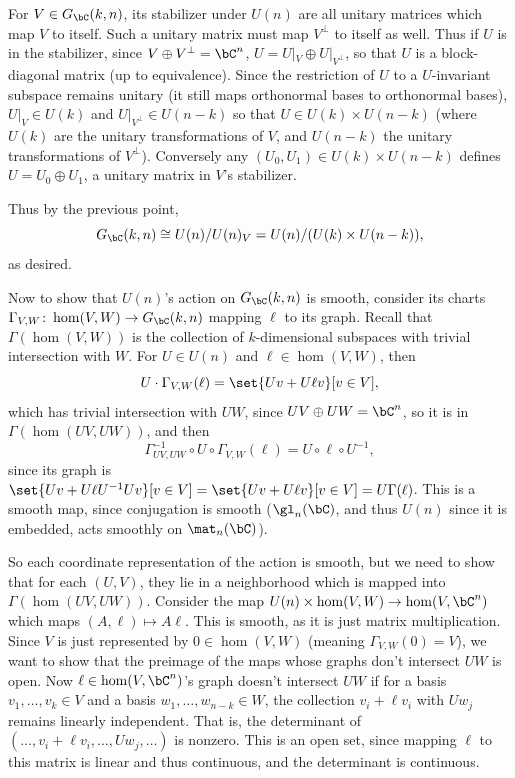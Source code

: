     For $V\in G_\bC(k,n)$, its stabilizer under $U(n)$ are all unitary matrices which map $V$ to itself.
    Such a unitary matrix must map $V^\perp$ to itself as well.
    Thus if $U$ is in the stabilizer, since $V\oplus V^\perp=\bC^n$, $U=U|_V\oplus U|_{V^\perp}$, so that $U$ is a block-diagonal matrix (up to equivalence).
    Since the restriction of $U$ to a $U$-invariant subspace remains unitary (it still maps orthonormal bases to orthonormal bases), $U|_V\in U(k)$ and $U|_{V^\perp}\in U(n-k)$
    so that $U\in U(k)\times U(n-k)$ (where $U(k)$ are the unitary transformations of $V$, and $U(n-k)$ the unitary transformations of $V^\perp$).
    Conversely any $(U_0,U_1)\in U(k)\times U(n-k)$ defines $U=U_0\oplus U_1$, a unitary matrix in $V$'s stabilizer.

    Thus by the previous point,
    $$ G_\bC(k,n) \cong U(n)/U(n)_V = U(n)/(U(k)\times U(n-k)) , $$
    as desired.

    Now to show that $U(n)$'s action on $G_\bC(k,n)$ is smooth, consider its charts $\Gamma_{V,W}\colon\hom(V,W)\to G_\bC(k,n)$ mapping $\ell$ to its graph.
    Recall that $\Gamma(\hom(V,W))$ is the collection of $k$-dimensional subspaces with trivial intersection with $W$.
    For $U\in U(n)$ and $\ell\in\hom(V,W)$, then
    $$ U\cdot\Gamma_{V,W}(\ell) = \set{Uv+U\ell v}[v\in V] , $$
    which has trivial intersection with $UW$, since $UV\oplus UW=\bC^n$, so it is in $\Gamma(\hom(UV,UW))$, and then
    $$ \Gamma^{-1}_{UV,UW}\circ U\circ\Gamma_{V,W}(\ell) = U\circ\ell\circ U^{-1}, $$
    since its graph is $\set{Uv+U\ell U^{-1}Uv}[v\in V]=\set{Uv+U\ell v}[v\in V]=U\Gamma(\ell)$.
    This is a smooth map, since conjugation is smooth ($\gl_n(\bC)$, and thus $U(n)$ since it is embedded, acts smoothly on $\mat_n(\bC)$).

    So each coordinate representation of the action is smooth, but we need to show that for each $(U,V)$, they lie in a neighborhood which is mapped into $\Gamma(\hom(UV,UW))$.
    Consider the map $U(n)\times\hom(V,W)\to\hom(V,\bC^n)$ which maps $(A,\ell)\mapsto A\ell$.
    This is smooth, as it is just matrix multiplication.
    Since $V$ is just represented by $0\in\hom(V,W)$ (meaning $\Gamma_{V,W}(0)=V$), we want to show that the preimage of the maps whose graphs don't intersect $UW$ is open.
    Now $\ell\in\hom(V,\bC^n)$'s graph doesn't intersect $UW$ if for a basis $v_1,\dots,v_k\in V$ and a basis $w_1,\dots,w_{n-k}\in W$, the collection $v_i+\ell v_i$ with $Uw_j$ remains
    linearly independent.
    That is, the determinant of $(\dots,v_i+\ell v_i,\dots,Uw_j,\dots)$ is nonzero.
    This is an open set, since mapping $\ell$ to this matrix is linear and thus continuous, and the determinant is continuous.

